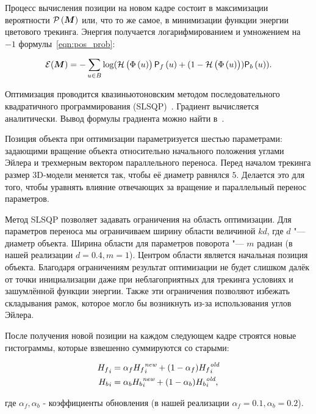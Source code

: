Процесс вычисления позиции на новом кадре состоит в максимизации вероятности
$\mathcal{P} \left( \bm{M} \right) $ или, что то же самое, в минимизации функции энергии
цветового трекинга.
Энергия получается логарифмированием и умножением на $-1$
формулы~\ref{eqn:pos_prob}:

\begin{equation}
\label{eqn:err_func}
\mathcal{E}(\bm{M}) = - \sum\limits_{\mathnormal{u} \in B}
\log(\mathcal{H} \left( \Phi \left( \mathnormal{u} \right) \right) \mathsf{P}_f \left( \mathnormal{u} \right) + (1 - \mathcal{H} \left( \Phi \left( \mathnormal{u} \right) \right))\mathsf{P}_b \left( \mathnormal{u} \right))
\text{.}
\end{equation}

Оптимизация проводится квазиньютоновским методом последовательного
квадратичного программирования (SLSQP)~\cite{SLSQP}.
Градиент вычисляется аналитически.
Вывод формулы градиента можно найти в~\cite{Tjaden2018}.

Позиция объекта при оптимизации параметризуется шестью параметрами:
задающими вращение объекта относительно начального положения углами Эйлера
и трехмерным вектором параллельного переноса.
Перед началом трекинга размер 3D-модели меняется так, чтобы её диаметр равнялся
$5$.
Делается это для того, чтобы уравнять влияние отвечающих за вращение и
параллельный перенос параметров.

Метод SLSQP позволяет задавать ограничения на область оптимизации.
Для параметров переноса мы ограничиваем ширину области величиной $kd$,
где $d$ "--- диаметр объекта.
Ширина области для параметров поворота "--- $m$ радиан (в нашей реализации $d
=0.4, m = 1$).
Центром области является начальная позиция объекта.
Благодаря ограничениям результат оптимизации не будет слишком далёк от точки
инициализации даже при неблагоприятных для трекинга условиях и зашумлённой
функции энергии.
Также эти ограничения позволяют избежать складывания рамок, которое
могло бы возникнуть из-за использования углов Эйлера.

После получения новой позиции на каждом следующем кадре строятся новые
гистограммы, которые взвешенно суммируются со старыми:

\begin{align}
{\ensuremath{H_f}}_i &= \alpha_f {H_f}_i^{\text{\it new}} + (1 - \alpha_f)
{H_f}_i^{\text{\it old}} \\{H_b}_i &= \alpha_b
{H_b}_i^{\text{\it new}} + (1 - \alpha_b) {H_b}_i^{\text{\it
old}}\text{,}
\end{align}

где $\alpha_f, \alpha_b$ - коэффициенты обновления (в нашей реализации
$\alpha_f = 0.1, \alpha_b = 0.2$).

